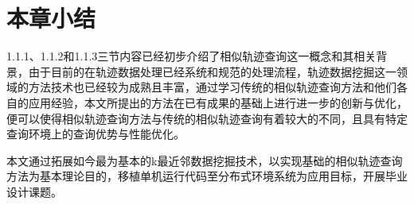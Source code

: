 \section{本章小结}
\label{sec:requirements}
1.1.1、1.1.2和1.1.3三节内容已经初步介绍了相似轨迹查询这一概念和其相关背景，由于目前的在轨迹数据处理已经系统和规范的处理流程，轨迹数据挖掘这一领域的方法技术也已经较为成熟且丰富，通过学习传统的相似轨迹查询方法和他们各自的应用经验，本文所提出的方法在已有成果的基础上进行进一步的创新与优化，便可以使得相似轨迹查询方法与传统的相似轨迹查询有着较大的不同，且具有特定查询环境上的查询优势与性能优化。

本文通过拓展如今最为基本的k最近邻数据挖掘技术，以实现基础的相似轨迹查询方法为基本理论目的，移植单机运行代码至分布式环境系统为应用目标，开展毕业设计课题。


